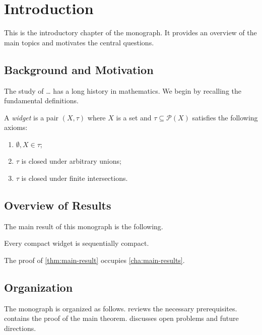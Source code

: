 
\chapter{Introduction}\label{cha:introduction}

This is the introductory chapter of the monograph.
It provides an overview of the main topics and motivates the central questions.

\section{Background and Motivation}\label{sec:background-motivation}

The study of \ldots{} has a long history in mathematics.
We begin by recalling the fundamental definitions.

\begin{definition}\label{def:fundamental-concept}
  A \emph{widget} is a pair $(X, \tau)$ where $X$ is a set and
  $\tau \subseteq \mathcal{P}(X)$ satisfies the following axioms:
  \begin{enumerate}
    \item $\emptyset, X \in \tau$;
    \item $\tau$ is closed under arbitrary unions;
    \item $\tau$ is closed under finite intersections.
  \end{enumerate}
\end{definition}

\section{Overview of Results}\label{sec:overview-results}

The main result of this monograph is the following.

\begin{theorem}\label{thm:main-result}
  Every compact widget is sequentially compact.
\end{theorem}

The proof of \cref{thm:main-result} occupies \cref{cha:main-results}.

\section{Organization}\label{sec:organization}

The monograph is organized as follows.
 reviews the necessary prerequisites.
 contains the proof of the main theorem.
 discusses open problems and future directions.

